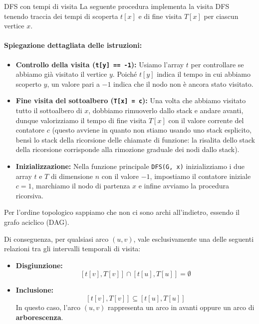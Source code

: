 \documentclass[12pt]{report}
\begin{document}
	\begin{algoritmo}{DFS con tempi di visita}{}
		La seguente procedura implementa la visita DFS tenendo traccia dei tempi di scoperta $t[x]$ e di fine visita $T[x]$ per ciascun vertice $x$.
		
		\paragraph{Spiegazione dettagliata delle istruzioni:}
		\begin{itemize}
			\item \textbf{Controllo della visita (\texttt{t[y] == -1}):} Usiamo l'array $t$ per controllare se abbiamo già visitato il vertice $y$. Poiché $t[y]$ indica il tempo in cui abbiamo scoperto $y$, un valore pari a $-1$ indica che il nodo non è ancora stato visitato.
			
			\item \textbf{Fine visita del sottoalbero (\texttt{T[x] = c}):} Una volta che abbiamo visitato tutto il sottoalbero di $x$, dobbiamo rimuoverlo dallo stack e andare avanti, dunque valorizziamo il tempo di fine visita $T[x]$ con il valore corrente del contatore $c$ (questo avviene in quanto non stiamo usando uno stack esplicito, bensì lo stack della ricorsione delle chiamate di funzione: la risalita dello stack della ricorsione corrisponde alla rimozione graduale dei nodi dallo stack).
			
			\item \textbf{Inizializzazione:} Nella funzione principale \texttt{DFS(G, x)} inizializziamo i due array $t$ e $T$ di dimensione $n$ con il valore $-1$, impostiamo il contatore iniziale $c = 1$, marchiamo il nodo di partenza $x$ e infine avviamo la procedura ricorsiva.
		\end{itemize}
	\end{algoritmo}
	
	Per l'ordine topologico sappiamo che non ci sono archi all'indietro, essendo il grafo aciclico (DAG).
	
	Di conseguenza, per qualsiasi arco $(u, v)$, vale esclusivamente una delle seguenti relazioni tra gli intervalli temporali di visita:
	\begin{itemize}
		\item \textbf{Disgiunzione:}
		\[
		[t[v], T[v]] \cap [t[u], T[u]] = \emptyset
		\]
		\item \textbf{Inclusione:}
		\[
		[t[v], T[v]] \subseteq [t[u], T[u]]
		\]
		In questo caso, l'arco $(u, v)$ rappresenta un arco in avanti oppure un arco di \textbf{arborescenza}.
	\end{itemize}
	
\end{document}
